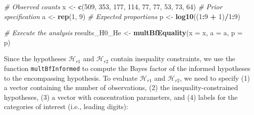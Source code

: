 \documentclass[
  english,
  man,floatsintext]{apa6}
\newenvironment{Shaded}{\begin{snugshade}}{\end{snugshade}}
\newcommand{\CommentTok}[1]{\textcolor[rgb]{0.56,0.35,0.01}{\textit{#1}}}
\newcommand{\DataTypeTok}[1]{\textcolor[rgb]{0.13,0.29,0.53}{#1}}
\newcommand{\DecValTok}[1]{\textcolor[rgb]{0.00,0.00,0.81}{#1}}
\newcommand{\KeywordTok}[1]{\textcolor[rgb]{0.13,0.29,0.53}{\textbf{#1}}}
\newcommand{\NormalTok}[1]{#1}
\newcommand{\OperatorTok}[1]{\textcolor[rgb]{0.81,0.36,0.00}{\textbf{#1}}}
\newcommand{\StringTok}[1]{\textcolor[rgb]{0.31,0.60,0.02}{#1}}
\begin{document}
\begin{Shaded}
\begin{Highlighting}[]
\CommentTok{\# Observed counts}
\NormalTok{x \textless{}{-}}\StringTok{ }\KeywordTok{c}\NormalTok{(}\DecValTok{509}\NormalTok{, }\DecValTok{353}\NormalTok{, }\DecValTok{177}\NormalTok{, }\DecValTok{114}\NormalTok{,  }\DecValTok{77}\NormalTok{,  }\DecValTok{77}\NormalTok{,  }\DecValTok{53}\NormalTok{,  }\DecValTok{73}\NormalTok{,  }\DecValTok{64}\NormalTok{)}
\CommentTok{\# Prior specification}
\NormalTok{a \textless{}{-}}\StringTok{  }\KeywordTok{rep}\NormalTok{(}\DecValTok{1}\NormalTok{, }\DecValTok{9}\NormalTok{)}
\CommentTok{\# Expected proportions}
\NormalTok{p \textless{}{-}}\StringTok{ }\KeywordTok{log10}\NormalTok{((}\DecValTok{1}\OperatorTok{:}\DecValTok{9} \OperatorTok{+}\StringTok{ }\DecValTok{1}\NormalTok{)}\OperatorTok{/}\DecValTok{1}\OperatorTok{:}\DecValTok{9}\NormalTok{)}

\CommentTok{\# Execute the analysis}
\NormalTok{results\_H0\_He  \textless{}{-}}\StringTok{ }\KeywordTok{multBfEquality}\NormalTok{(}\DataTypeTok{x =}\NormalTok{ x, }\DataTypeTok{a =}\NormalTok{ a, }\DataTypeTok{p =}\NormalTok{ p)}
\end{Highlighting}
\end{Shaded}

Since the hypotheses \(\mathcal{H}_{r1}\) and \(\mathcal{H}_{r2}\) contain inequality constraints, we use the function \texttt{multBfInformed} to compute the Bayes factor of the informed hypotheses to the encompassing hypothesis. To evaluate \(\mathcal{H}_{r1}\) and \(\mathcal{H}_{r2}\), we need to specify
(1) a vector containing the number of observations, (2) the inequality-constrained hypotheses,
(3) a vector with concentration parameters, and (4) labels for the categories of interest
(i.e., leading digits):
\end{document}
